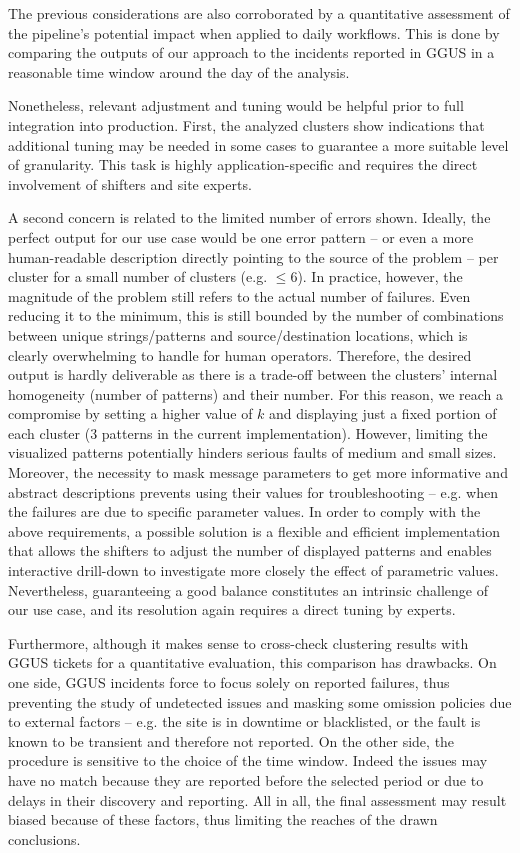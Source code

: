 The previous considerations are also corroborated by a quantitative assessment of the pipeline's potential impact when applied to daily workflows. This is done by comparing the outputs of our approach to the incidents reported in GGUS in a reasonable time window around the day of the analysis.

Nonetheless, relevant adjustment and tuning would be helpful prior to full integration into production.
First, the analyzed clusters show indications that additional tuning may be needed in some cases to guarantee a more suitable level of granularity.
This task is highly application-specific and requires the direct involvement of shifters and site experts.

A second concern is related to the limited number of errors shown.
Ideally, the perfect output for our use case would be one error pattern
-- or even a more human-readable description directly pointing to the source of the problem -- 
per cluster for a small number of clusters (e.g. $\leq6$).
In practice, however, the magnitude of the problem still refers to the actual number of failures. Even reducing it to the minimum, this is still bounded by the number of combinations between unique strings/patterns and source/destination locations, which is clearly overwhelming to handle for human operators.
Therefore, the desired output is hardly deliverable as there is a trade-off between the clusters' internal homogeneity (number of patterns) and their number.
For this reason, we reach a compromise by setting a higher value of $k$ and displaying just a fixed portion of each cluster (3 patterns in the current implementation).
However, limiting the visualized patterns potentially hinders serious faults of medium and small sizes.
Moreover, the necessity to mask message parameters to get more informative and abstract descriptions prevents using their values for troubleshooting -- e.g. when the failures are due to specific parameter values.
In order to comply with the above requirements, a possible solution is a flexible and efficient implementation that allows the shifters to adjust the number of displayed patterns and enables interactive drill-down to investigate more closely the effect of parametric values.
Nevertheless, guaranteeing a good balance constitutes an intrinsic challenge of our use case, and its resolution again requires a direct tuning by experts.

Furthermore, although it makes sense to cross-check clustering results with GGUS tickets for a quantitative evaluation, this comparison has drawbacks. 
On one side, GGUS incidents force to focus solely on reported failures, thus preventing the study of undetected issues and masking some omission policies due to external factors -- e.g. the site is in downtime or blacklisted, or the fault is known to be transient and therefore not reported.
On the other side, the procedure is sensitive to the choice of the time window.
Indeed the issues may have no match because they are reported before the selected period or due to delays in their discovery and reporting. 
All in all, the final assessment may result biased because of these factors, thus limiting the reaches of the drawn conclusions.

